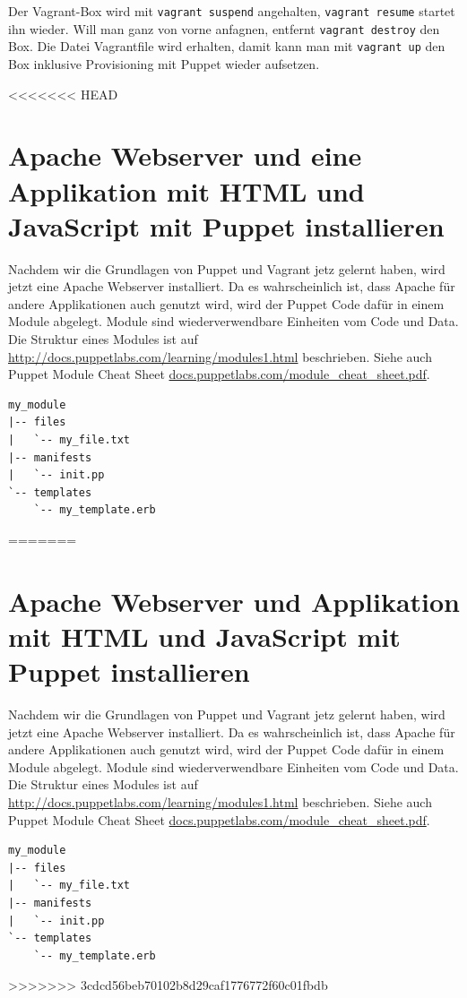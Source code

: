 \documentclass[12pt,a4paper,ngerman]{article}
\begin{document}
Der Vagrant-Box wird mit \lstinline$vagrant suspend$ angehalten, \lstinline$vagrant resume$ startet ihn wieder. Will man ganz von vorne anfagnen, entfernt \lstinline$vagrant destroy$ den Box. Die Datei Vagrantfile wird erhalten, damit kann man mit \lstinline$vagrant up$ den Box inklusive Provisioning mit Puppet wieder aufsetzen.

<<<<<<< HEAD
\section{Apache Webserver und eine Applikation mit HTML und JavaScript mit Puppet installieren}
Nachdem wir die Grundlagen von Puppet und Vagrant jetz gelernt haben, wird jetzt eine Apache Webserver installiert. Da es wahrscheinlich ist, dass Apache für andere Applikationen auch genutzt wird, wird der Puppet Code dafür in einem Module abgelegt. Module sind wiederverwendbare Einheiten vom Code und Data. Die Struktur eines Modules ist auf \url{http://docs.puppetlabs.com/learning/modules1.html} beschrieben. Siehe auch Puppet Module Cheat Sheet \url{docs.puppetlabs.com/module_cheat_sheet.pdf}.

\begin{lstlisting}[language=tree,caption=Puppet Module Struktur, label=module_structure]
my_module
|-- files
|   `-- my_file.txt
|-- manifests
|   `-- init.pp
`-- templates
    `-- my_template.erb
\end{lstlisting}
=======
\section{Apache Webserver und Applikation mit HTML und JavaScript mit Puppet installieren}
Nachdem wir die Grundlagen von Puppet und Vagrant jetz gelernt haben, wird jetzt eine Apache Webserver installiert. Da es wahrscheinlich ist, dass Apache für andere Applikationen auch genutzt wird, wird der Puppet Code dafür in einem Module abgelegt. Module sind wiederverwendbare Einheiten vom Code und Data. Die Struktur eines Modules ist auf \url{http://docs.puppetlabs.com/learning/modules1.html} beschrieben. Siehe auch Puppet Module Cheat Sheet \url{docs.puppetlabs.com/module_cheat_sheet.pdf}.

\begin{lstlisting}[language=tree,caption=Puppet Module Struktur, label=module_structure]
my_module
|-- files
|   `-- my_file.txt
|-- manifests
|   `-- init.pp
`-- templates
    `-- my_template.erb
\end{lstlisting}
>>>>>>> 3cdcd56beb70102b8d29caf1776772f60c01fbdb
\end{document}
